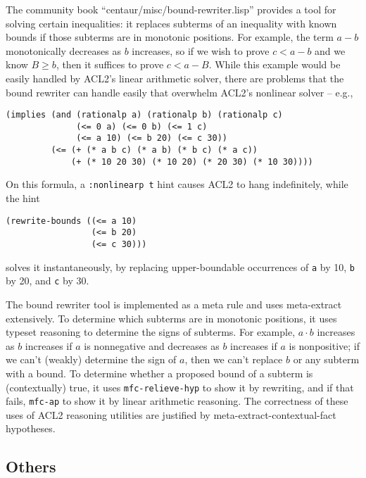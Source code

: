 The community book ``centaur/misc/bound-rewriter.lisp'' provides a
tool for solving certain inequalities: it replaces subterms of an
inequality with known bounds if those subterms are in monotonic
positions.  For example, the term $a-b$ monotonically decreases as $b$
increases, so if we wish to prove $c<a-b$ and we know $B \geq b$, then
it suffices to prove $c<a-B$.  While this example would be easily
handled by ACL2's linear arithmetic solver, there are problems that
the bound rewriter can handle easily that overwhelm ACL2's nonlinear
solver -- e.g.,
\begin{verbatim}
(implies (and (rationalp a) (rationalp b) (rationalp c)
              (<= 0 a) (<= 0 b) (<= 1 c)
              (<= a 10) (<= b 20) (<= c 30))
         (<= (+ (* a b c) (* a b) (* b c) (* a c))
             (+ (* 10 20 30) (* 10 20) (* 20 30) (* 10 30))))
\end{verbatim}
On this formula, a \texttt{:nonlinearp t} hint causes ACL2 to hang indefinitely, while the hint
\begin{verbatim}
(rewrite-bounds ((<= a 10)
                 (<= b 20)
                 (<= c 30)))
\end{verbatim}
solves it instantaneously, by replacing upper-boundable occurrences of
\texttt{a} by 10, \texttt{b} by 20, and \texttt{c} by 30.

The bound rewriter tool is implemented as a meta rule and uses
meta-extract extensively.  To determine which subterms are in
monotonic positions, it uses typeset reasoning to determine the signs
of subterms.  For example, $a \cdot b$ increases as $b$ increases if
$a$ is nonnegative and decreases as $b$ increases if $a$ is
nonpositive; if we can't (weakly) determine the sign of $a$, then we
can't replace $b$ or any subterm with a bound.  To determine whether a
proposed bound of a subterm is (contextually) true, it uses
\texttt{mfc-relieve-hyp} to show it by rewriting, and if that fails,
\texttt{mfc-ap} to show it by linear arithmetic reasoning.  The
correctness of these uses of ACL2 reasoning utilities are justified by
meta-extract-contextual-fact hypotheses.

\subsection{Others}

